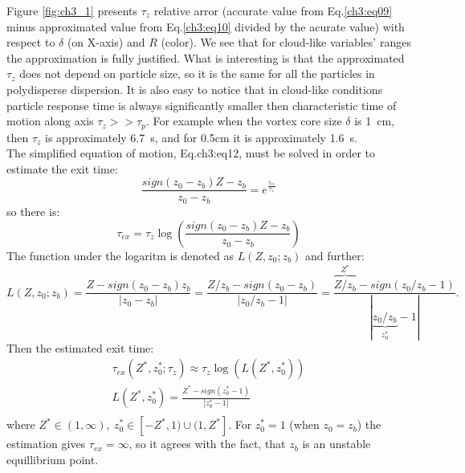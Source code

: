 \documentclass[../main.tex]{subfiles}
\begin{document}
Figure \ref{fig:ch3_1} presents $\tau_z$ relative arror (accurate value from Eq.\ref{ch3:eq09} minus approximated value from Eq.\ref{ch3:eq10} divided by the acurate value) with respect to $\delta$ (on X-axis) and $R$ (color). We see that for cloud-like variables' ranges the approximation is fully justified. What is interesting is that the approximated $\tau_z$ does not depend on particle size, so it is the same for all the particles in polydisperse dispersion. It is also easy to notice that in cloud-like conditions particle response time is always significantly smaller then characteristic time of motion along axis $\tau_z>>\tau_p$. For example when the vortex core size $\delta$ is 1~cm, then $\tau_z$ is approximately 6.7~s, and for 0.5cm it is approximately 1.6~s.\\
The simplified equation of motion, Eq.{ch3:eq12}, must be solved in order to estimate the exit time:
\begin{equation}
\frac{sign(z_0-z_b)Z-z_b}{z_0-z_b}=e^{\frac{\tau_{ex}}{\tau_z}}
\label{ch3:eq07}
\end{equation}
so there is:
\begin{equation}
\tau_{ex}=\tau_z \log\left(\frac{sign(z_0-z_b)Z-z_b}{z_0-z_b} \right)
\label{ch3:eq12b}
\end{equation}
The function under the logaritm is denoted as $L(Z,z_0;z_b)$ and further:
\begin{equation}
L(Z,z_0;z_b)=\frac{Z-sign(z_0-z_b)z_b}{|z_0-z_b|}=\frac{Z/z_b-sign(z_0-z_b)}{|z_0/z_b-1|}=
\frac{\overbrace{Z/z_b}^{Z^\ast}-sign(z_0/z_b-1)}{|\underbrace{z_0/z_b}_{z_0^\ast}-1|}.
\label{ch3:eq13}
\end{equation}
Then the estimated exit time:
\begin{align}
\tau_{ex}(Z^\ast,z_0^\ast; \tau_z)\approx \tau_z \log\left(L(Z^\ast,z_0^\ast)\right)\\
L(Z^\ast,z_0^\ast)= \frac{Z^\ast-sign(z_0^\ast-1)}{|z_0^\ast-1|}\\
\label{ch3:eq14}
\end{align}
where $Z^\ast \in (1,\infty), \ z_0^\ast \in [-Z^\ast,1)\cup (1,Z^\ast]$. For $z_0^\ast=1$ (when $z_0=z_b$) the estimation gives $\tau_{ex}=\infty$, so it agrees with the fact, that $z_b$ is an unstable equillibrium point.
\end{document}

